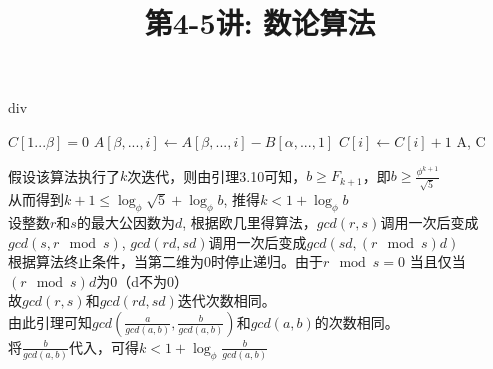 \documentclass[a4paper, justified]{tufte-handout}
\title{第4-5讲: 数论算法}
\date{\zhtoday} %
\begin{document}
\maketitle
\noplagiarism %
\begin{abstract}
\end{abstract}
\beginrequired

\begin{problem}[TC 31.1-12]
\end{problem}

\begin{solution}
\begin{algorithm}
\caption{div}\label{euclid}
\begin{algorithmic}[1]
	\State $C[1...\beta] = 0$
				\State $A[\beta,...,i]\gets A[\beta,...,i]-B[\alpha,...,1]$
				\State $C[i]\gets C[i] + 1$
			\EndWhile
		\EndFor
	\State \Return A, C 
	\EndProcedure
\end{algorithmic}
\end{algorithm}
\end{solution}

\begin{problem}[TC 31.2-5]
\end{problem}

\begin{solution}
假设该算法执行了$k$次迭代，则由引理3.10可知，$b\geq F_{k+1}$，即$b\geq \frac{\phi^{k+1}}{\sqrt{5}}$\\
从而得到$k+1\leq \log_{\phi}\sqrt{5}+ \log_{\phi}b$, 推得$k<1+ \log_{\phi}b$\\
设整数$r$和$s$的最大公因数为$d$, 根据欧几里得算法，$gcd(r,s)$调用一次后变成$gcd(s, r\mod s)$, $gcd(rd,sd)$调用一次后变成$gcd(sd, (r\mod s)d)$\\
根据算法终止条件，当第二维为$0$时停止递归。由于$r \mod s =0$ 当且仅当$ (r\mod s)d$为0（d不为0）\\
故$gcd(r,s)$和$gcd(rd,sd)$迭代次数相同。\\
由此引理可知$gcd(\frac{a}{gcd(a,b)}, \frac{b}{gcd(a,b)})$和$gcd(a,b)$的次数相同。\\
将$\frac{b}{gcd(a,b)}$代入，可得$k<1+ \log_{\phi}\frac{b}{gcd(a,b)}$
\end{solution}
\end{document}
